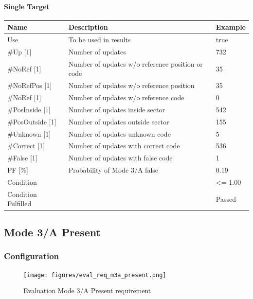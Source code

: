 \paragraph{Single Target}

\begin{center}
 \begin{table}[H]
  \begin{tabularx}{\textwidth}{ | l | X |  l | }
    \hline
    \textbf{Name} & \textbf{Description} & \textbf{Example} \\ \hline
    Use & To be used in results & true \\ \hline
    \#Up [1] & Number of updates & 732 \\ \hline
    \#NoRef [1] & Number of updates w/o reference position or code & 35 \\ \hline
    \#NoRefPos [1] & Number of updates w/o reference position  & 35 \\ \hline
    \#NoRef [1] & Number of updates w/o reference code & 0 \\ \hline
    \#PosInside [1] & Number of updates inside sector & 542 \\ \hline
    \#PosOutside [1] & Number of updates outside sector & 155 \\ \hline
    \#Unknown [1] & Number of updates unknown code & 5 \\ \hline
    \#Correct [1] & Number of updates with correct code & 536 \\ \hline
    \#False [1] & Number of updates with false code & 1 \\ \hline
    PF [\%] & Probability of Mode 3/A false & 0.19 \\ \hline
    Condition &  & <= 1.00 \\ \hline
    Condition Fulfilled &  & Passed \\ \hline
\end{tabularx}
\end{table}
\end{center}

\subsection{Mode 3/A Present}
\label{sec:eval_req_m3a_present} 

\subsubsection{Configuration}

\begin{figure}[H]
    \texttt{[image: figures/eval\_req\_m3a\_present.png]}
  \caption{Evaluation Mode 3/A Present requirement}
\end{figure}

